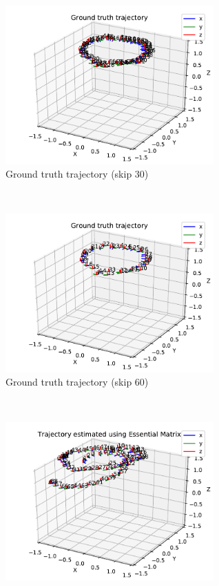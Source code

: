 \documentclass[12pt,a4paper]{article}
\begin{document}
    \begin{figure}[p]
      \begin{subfigure}[t]{0.5\textwidth}
      \centering
        \includegraphics[width=80mm]{../quad/basic-reg-saves/30/atrj_gt.pdf}
        \caption{Ground truth trajectory (skip 30)}
      \end{subfigure} %
      ~
      \begin{subfigure}[t]{0.5\textwidth}
        \includegraphics[width=80mm]{../quad/basic-reg-saves/60/atrj_gt.pdf}
        \caption{Ground truth trajectory (skip 60)}
      \end{subfigure} \\
      \begin{subfigure}[t]{0.5\textwidth}
        \includegraphics[width=80mm]{../quad/basic-reg-saves/30/atrj_rgb.pdf}

\end{subfigure}
\end{figure}
\end{document}
